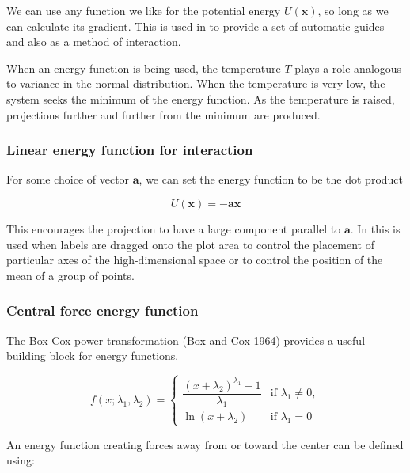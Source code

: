 We can use any function we like for the potential energy \(U(\mathbf x)\), so long as we can calculate its gradient. This is used in  to provide a set of automatic guides and also as a method of interaction.

When an energy function is being used, the temperature \(T\) plays a role analogous to variance in the normal distribution. When the temperature is very low, the system seeks the minimum of the energy function. As the temperature is raised, projections further and further from the minimum are produced.

\hypertarget{linear-energy-function-for-interaction}{%
\subsubsection{Linear energy function for interaction}\label{linear-energy-function-for-interaction}}

For some choice of vector \(\mathbf a\), we can set the energy function to be the dot product

\begin{equation*}
U(\mathbf x) = - \mathbf a \mathbf x
\end{equation*}

This encourages the projection to have a large component parallel to \(\mathbf a\). In  this is used when labels are dragged onto the plot area to control the placement of particular axes of the high-dimensional space or to control the position of the mean of a group of points.

\hypertarget{central-force-energy-function}{%
\subsubsection{Central force energy function}\label{central-force-energy-function}}

The Box-Cox power transformation (Box and Cox 1964) provides a useful building block for energy functions.

\[
f(x ; \lambda_1 , \lambda_2) = 
\begin{cases}
 \dfrac{(x + \lambda_2)^{\lambda_1} - 1}{\lambda_1} & \text{if } \lambda_1 \neq 0, \\
 \ln (x + \lambda_2) & \text{if } \lambda_1 = 0
\end{cases}
\]

An energy function creating forces away from or toward the center can be defined using:

